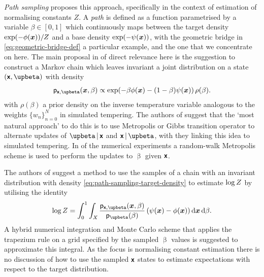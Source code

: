 \emph{Path sampling} \citep{gelman1998simulating} proposes this approach, specifically in the context of estimation of normalising constants $Z$. A \emph{path} is defined as a function parametrised by a variable $\beta \in [0,1]$ which continuously maps between the target density $\exp\lpa-\phi(\vct{x})\rpa / \normconst$  and a base density $\exp\lpa-\psi(\vct{x})\rpa$, with the geometric bridge in \eqref{eq:geometric-bridge-def} a particular example, and the one that we concentrate on here.  The main proposal in \citep{gelman1998simulating} of direct relevance here is the suggestion to construct a Markov chain which leaves invariant a joint distribution on a state $(\rvct{x},\upbeta)$ with density
\vspace{-1mm}
\begin{equation}\label{eq:path-sampling-target-density}
\pden{\rvct{x},\upbeta}(\vct{x},\beta) \propto 
\exp\lpa -\beta\phi(\vct{x}) - (1-\beta)\psi(\vct{x}) \rpa\,\rho(\beta).
\end{equation}
with $\rho(\beta)$ a prior density on the inverse temperature variable analogous to the weights $\lbrace w_n \rbrace_{n=0}^N$ in simulated tempering. The authors of \citep{gelman1998simulating} suggest that the `most natural approach' to do this is to use Metropolis or Gibbs transition operator to alternate updates of $\upbeta\gvn\rvct{x}$ and $\rvct{x}\gvn\upbeta$, with they linking this idea to simulated tempering. In of the numerical experiments a random-walk Metropolis scheme is used to perform the updates to $\upbeta$ given $\boldsymbol{\mathsf{x}}$.

The authors of \citep{gelman1998simulating} suggest a method to use the samples of a chain with an invariant distribution with density \eqref{eq:path-sampling-target-density} to estimate $\log Z$ by utilising the identity
\vspace{-1mm}
\begin{equation}\label{thermodynamic-integration-path-sampling}
\log \normconst =
\int_0^1 \int_{\set{X}}
  \frac{\pden{\rvct{x},\upbeta}(\vct{x},\beta)}{\pden{\upbeta}(\beta)}\,
  \lpa \psi(\vct{x}) - \phi(\vct{x}) \rpa
\,\dr\vct{x}\,\dr\beta.
\end{equation}
A hybrid numerical integration and Monte Carlo scheme that applies the trapezium rule on a grid specified by the sampled $\upbeta$ values is suggested to approximate this integral. As the focus is normalising constant estimation there is no discussion of how to use the sampled $\boldsymbol{\mathsf{x}}$ states to estimate expectations with respect to the target distribution.

